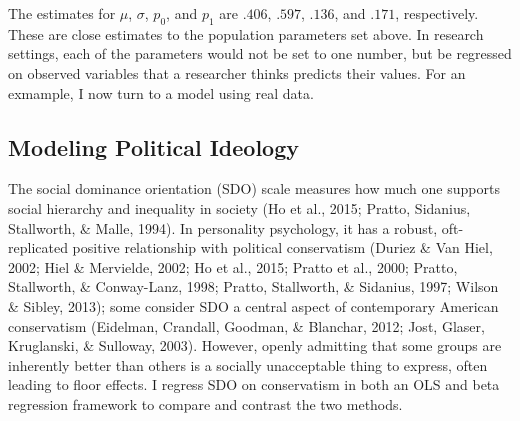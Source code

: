 \documentclass[english,man]{apa6}
\newenvironment{Shaded}{\begin{snugshade}}{\end{snugshade}}
\newcommand{\KeywordTok}[1]{\textcolor[rgb]{0.13,0.29,0.53}{\textbf{#1}}}
\newcommand{\DecValTok}[1]{\textcolor[rgb]{0.00,0.00,0.81}{#1}}
\newcommand{\StringTok}[1]{\textcolor[rgb]{0.31,0.60,0.02}{#1}}
\newcommand{\CommentTok}[1]{\textcolor[rgb]{0.56,0.35,0.01}{\textit{#1}}}
\newcommand{\ControlFlowTok}[1]{\textcolor[rgb]{0.13,0.29,0.53}{\textbf{#1}}}
\newcommand{\OperatorTok}[1]{\textcolor[rgb]{0.81,0.36,0.00}{\textbf{#1}}}
\newcommand{\NormalTok}[1]{#1}
\theoremstyle{definition}
\theoremstyle{definition}
\theoremstyle{remark}
\begin{document}
\begin{Shaded}
\end{Shaded}

The estimates for \(\mu\), \(\sigma\), \(p_0\), and \(p_1\) are
\(.406\), \(.597\), \(.136\), and \(.171\), respectively. These are
close estimates to the population parameters set above. In research
settings, each of the parameters would not be set to one number, but be
regressed on observed variables that a researcher thinks predicts their
values. For an exmample, I now turn to a model using real data.

\subsection{Modeling Political
Ideology}\label{modeling-political-ideology}

The social dominance orientation (SDO) scale measures how much one
supports social hierarchy and inequality in society (Ho et al., 2015;
Pratto, Sidanius, Stallworth, \& Malle, 1994). In personality
psychology, it has a robust, oft-replicated positive relationship with
political conservatism (Duriez \& Van Hiel, 2002; Hiel \& Mervielde,
2002; Ho et al., 2015; Pratto et al., 2000; Pratto, Stallworth, \&
Conway-Lanz, 1998; Pratto, Stallworth, \& Sidanius, 1997; Wilson \&
Sibley, 2013); some consider SDO a central aspect of contemporary
American conservatism (Eidelman, Crandall, Goodman, \& Blanchar, 2012;
Jost, Glaser, Kruglanski, \& Sulloway, 2003). However, openly admitting
that some groups are inherently better than others is a socially
unacceptable thing to express, often leading to floor effects. I regress
SDO on conservatism in both an OLS and beta regression framework to
compare and contrast the two methods.
\end{document}
